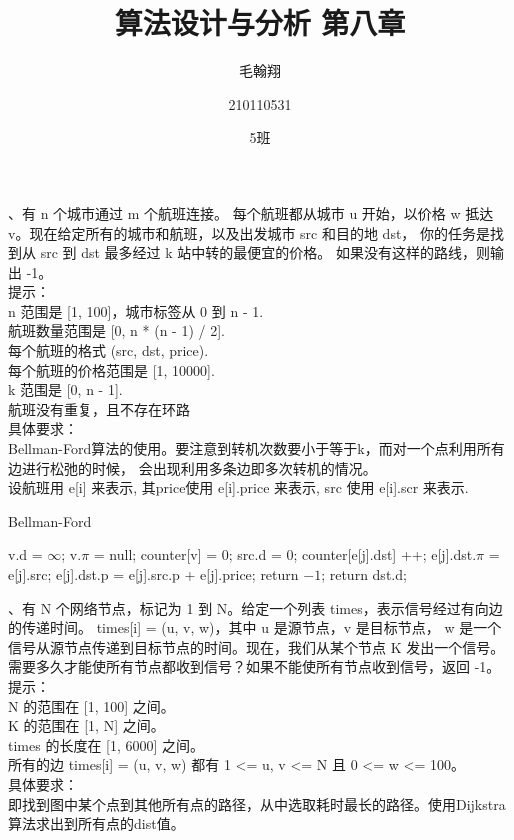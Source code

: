\documentclass[a4paper, 10pt]{ctexart} %
\title{算法设计与分析 第八章}
\author{毛翰翔 \and 210110531 \and 5班}
\begin{document}
\begin{titlepage}
\maketitle
\end{titlepage}

、有 n 个城市通过 m 个航班连接。
每个航班都从城市 u 开始，以价格 w 抵达 v。现在给定所有的城市和航班，以及出发城市 src 和目的地 dst，
你的任务是找到从 src 到 dst 最多经过 k 站中转的最便宜的价格。 
如果没有这样的路线，则输出 -1。\\
提示：\\
    n 范围是 [1, 100]，城市标签从 0 到 n - 1.\\
    航班数量范围是 [0, n * (n - 1) / 2].\\
    每个航班的格式 (src, dst, price).\\
    每个航班的价格范围是 [1, 10000].\\
    k 范围是 [0, n - 1].\\
航班没有重复，且不存在环路\\
具体要求：\\
	Bellman-Ford算法的使用。要注意到转机次数要小于等于k，而对一个点利用所有边进行松弛的时候，
    会出现利用多条边即多次转机的情况。\\ [15pt]
 设航班用 e[i] 来表示, 其price使用 e[i].price 来表示, src 使用 e[i].scr 来表示. \\
\begin{algorithm}
    \caption{Bellman-Ford}
    \begin{algorithmic}[1]
        \State v.d = $\infty$; 
        \State v.$\pi$ = null;
        \State counter[v] = 0;
        \EndFor
        \State src.d = 0;
        \State counter[e[j].dst] ++;
        \State e[j].dst.$\pi$ = e[j].src;
        \State e[j].dst.p = e[j].src.p + e[j].price;
        \EndIf
        \EndFor
        \EndFor
        \State return $-1$;
        \EndIf
        \State return dst.d; 
    \end{algorithmic} 
\end{algorithm}
\newpage

、有 N 个网络节点，标记为 1 到 N。给定一个列表 times，表示信号经过有向边的传递时间。 times[i] = (u, v, w)，其中 u 是源节点，v 是目标节点， w 是一个信号从源节点传递到目标节点的时间。现在，我们从某个节点 K 发出一个信号。需要多久才能使所有节点都收到信号？如果不能使所有节点收到信号，返回 -1。
提示：\\
    N 的范围在 [1, 100] 之间。\\
    K 的范围在 [1, N] 之间。\\ 
    times 的长度在 [1, 6000] 之间。\\ 
所有的边 times[i] = (u, v, w) 都有 1 <= u, v <= N 且 0 <= w <= 100。\\ 
具体要求：\\ 
	即找到图中某个点到其他所有点的路径，从中选取耗时最长的路径。使用Dijkstra算法求出到所有点的dist值。\\ [15pt]
\end{document}
